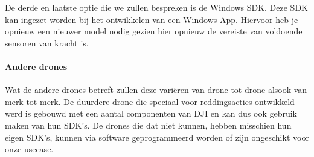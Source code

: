 De derde en laatste optie die we zullen bespreken is de Windows SDK. Deze SDK kan ingezet worden bij het ontwikkelen van een Windows App. Hiervoor heb je opnieuw een nieuwer model nodig gezien hier opnieuw de vereiste van voldoende sensoren van kracht is. 

\paragraph{Andere drones}

Wat de andere drones betreft zullen deze variëren van drone tot drone alsook van merk tot merk. De duurdere drone die speciaal voor reddingsacties ontwikkeld werd is gebouwd met een aantal componenten van DJI en kan dus ook gebruik maken van hun SDK's. De drones die dat niet kunnen, hebben misschien hun eigen SDK's, kunnen via software geprogrammeerd worden of zijn ongeschikt voor onze usecase.

